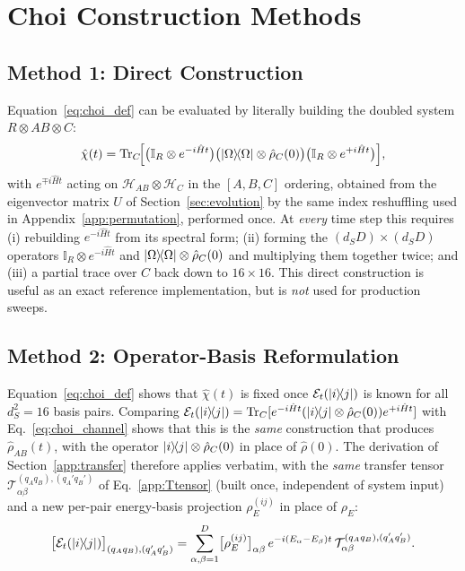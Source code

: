 \documentclass[12pt,a4paper]{article}
\newcommand{\Ham}{\hat{H}}
\newcommand{\rhohat}{\hat{\rho}}
\newcommand{\Hilb}{\mathcal{H}}
\newcommand{\TrC}{\mathrm{Tr}_C}
\begin{document}
\section{Choi Construction Methods}
\label{app:choi_methods}

\subsection{Method 1: Direct Construction}
\label{subsec:choi_brute}

Equation~\eqref{eq:choi_def} can be evaluated by literally building the
doubled system $R\otimes AB\otimes C$:
\begin{equation}
  \hat{\chi}(t) = \TrC\!\Bigl[
    \bigl(\mathbb{I}_R\otimes e^{-i\Ham t}\bigr)
    \bigl(\ketbra{\Omega}{\Omega}\otimes\rhohat_C(0)\bigr)
    \bigl(\mathbb{I}_R\otimes e^{+i\Ham t}\bigr)
  \Bigr],
  \label{eq:choi_brute}
\end{equation}
with $e^{\mp i\Ham t}$ acting on $\Hilb_{AB}\otimes\Hilb_C$ in the $[A,B,C]$
ordering, obtained from the eigenvector matrix $U$ of
Section~\ref{sec:evolution} by the same index reshuffling used in
Appendix~\ref{app:permutation}, performed once. At
\emph{every} time step this requires (i) rebuilding $e^{-i\Ham t}$ from its
spectral form; (ii) forming the
$(d_SD)\times(d_SD)$ operators $\mathbb{I}_R\otimes e^{-i\Ham t}$ and
$\ketbra{\Omega}{\Omega}\otimes\rhohat_C(0)$ and multiplying them together
twice; and (iii) a partial trace over $C$ back down to $16\times16$.
This direct construction is useful as an exact reference implementation,
but is \emph{not} used for production sweeps.

\subsection{Method 2: Operator-Basis Reformulation}
\label{subsec:choi_fast}

Equation~\eqref{eq:choi_def} shows that $\hat\chi(t)$ is fixed once
$\mathcal{E}_t(\ketbra{i}{j})$ is known for all $d_S^2=16$ basis pairs.
Comparing $\mathcal{E}_t(\ketbra{i}{j})=\TrC[e^{-i\Ham t}(\ketbra{i}{j}\otimes\rhohat_C(0))e^{+i\Ham t}]$
with Eq.~\eqref{eq:choi_channel} shows that this is the \emph{same}
construction that produces $\rhohat_{AB}(t)$, with the operator
$\ketbra{i}{j}\otimes\rhohat_C(0)$ in place of $\rhohat(0)$. The derivation of
Section~\ref{app:transfer} therefore applies verbatim, with the
\emph{same} transfer tensor $\mathcal{T}^{(q_Aq_B),(q_A'q_B')}_{\alpha\beta}$
of Eq.~\eqref{app:Ttensor} (built once, independent of system input) and a
new per-pair energy-basis projection $\rho_E^{(ij)}$ in place of $\rho_E$:
\begin{equation}
  \bigl[\mathcal{E}_t(\ketbra{i}{j})\bigr]_{(q_Aq_B),(q_A'q_B')}
  = \sum_{\alpha,\beta=1}^{D} \bigl[\rho_E^{(ij)}\bigr]_{\alpha\beta}\,
    e^{-i(E_\alpha-E_\beta)t}\,
    \mathcal{T}_{\alpha\beta}^{(q_Aq_B),(q_A'q_B')}.
  \label{eq:choi_obi}
\end{equation}
\end{document}
